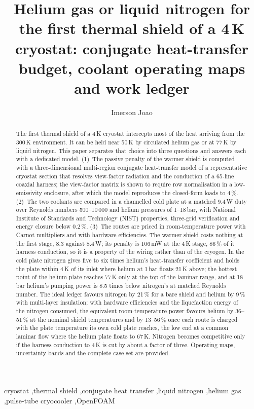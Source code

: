 \documentclass[preprint,12pt]{elsarticle}
\begin{document}
\begin{frontmatter}

\title{Helium gas or liquid nitrogen for the first thermal shield of a 4\,K cryostat:
conjugate heat-transfer budget, coolant operating maps and work ledger}

\author[oxf]{Imerson Joao}

\begin{abstract}
The first thermal shield of a 4\,K cryostat intercepts most of the heat arriving from the
300\,K environment. It can be held near 50\,K by circulated helium gas or at 77\,K by liquid
nitrogen. This paper separates that choice into three questions and answers each with a
dedicated model. (1)~The passive penalty of the warmer shield is computed with a
three-dimensional multi-region conjugate heat-transfer model of a representative cryostat
section that resolves view-factor radiation and the conduction of a 65-line coaxial harness;
the view-factor matrix is shown to require row normalisation in a low-emissivity enclosure,
after which the model reproduces the closed-form loads to 4\,\%. (2)~The two coolants are
compared in a channelled cold plate at a matched 9.4\,W duty over Reynolds numbers
500--10\,000 and helium pressures of 1--18\,bar, with National Institute of Standards and
Technology (NIST) properties, three-grid verification and energy closure below 0.2\,\%.
(3)~The routes are priced in room-temperature power with Carnot multipliers and with hardware
efficiencies. The warmer shield costs nothing at the first stage, 8.3 against 8.4\,W; its
penalty is 106\,mW at the 4\,K stage, 86\,\% of it harness conduction, so it is a property of
the wiring rather than of the cryogen. In the cold plate nitrogen gives five to six times
helium's heat-transfer coefficient and holds the plate within 4\,K of its inlet where helium
at 1\,bar floats 21\,K above; the hottest point of the helium plate reaches 77\,K only at the
top of the laminar range, and at 18\,bar helium's pumping power is 8.5 times below nitrogen's at matched
Reynolds number. The ideal ledger favours nitrogen by 21\,\% for a bare shield and helium by
9\,\% with multi-layer insulation; with hardware efficiencies and the liquefaction energy of
the nitrogen consumed, the equivalent room-temperature power favours helium by 36--51\,\% at
the nominal shield temperatures and by 13--56\,\% once each route is charged with the plate
temperature its own cold plate reaches, the low end at a common laminar flow where the helium
plate floats to 67\,K. Nitrogen becomes competitive only if the harness conduction to 4\,K is
cut by about a factor of three. Operating maps,
uncertainty bands and the complete case set are provided.
\end{abstract}

\begin{keyword}
cryostat \sep thermal shield \sep conjugate heat transfer \sep liquid nitrogen \sep helium gas
\sep pulse-tube cryocooler \sep OpenFOAM
\end{keyword}
\end{frontmatter}
\end{document}
